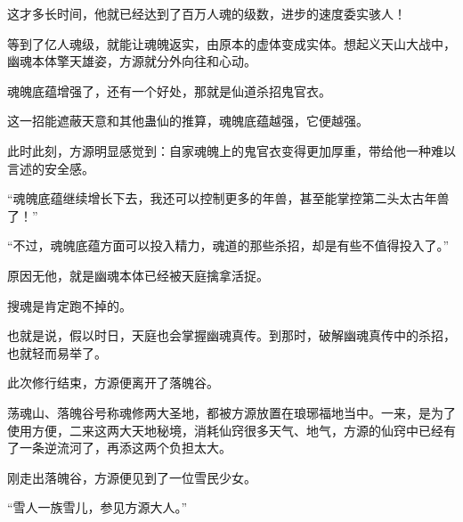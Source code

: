 \begin{this_body}
这才多长时间，他就已经达到了百万人魂的级数，进步的速度委实骇人！

等到了亿人魂级，就能让魂魄返实，由原本的虚体变成实体。想起义天山大战中，幽魂本体擎天雄姿，方源就分外向往和心动。

魂魄底蕴增强了，还有一个好处，那就是仙道杀招鬼官衣。

这一招能遮蔽天意和其他蛊仙的推算，魂魄底蕴越强，它便越强。

此时此刻，方源明显感觉到：自家魂魄上的鬼官衣变得更加厚重，带给他一种难以言述的安全感。

“魂魄底蕴继续增长下去，我还可以控制更多的年兽，甚至能掌控第二头太古年兽了！”

“不过，魂魄底蕴方面可以投入精力，魂道的那些杀招，却是有些不值得投入了。”

原因无他，就是幽魂本体已经被天庭擒拿活捉。

搜魂是肯定跑不掉的。

也就是说，假以时日，天庭也会掌握幽魂真传。到那时，破解幽魂真传中的杀招，也就轻而易举了。

此次修行结束，方源便离开了落魄谷。

荡魂山、落魄谷号称魂修两大圣地，都被方源放置在琅琊福地当中。一来，是为了使用方便，二来这两大天地秘境，消耗仙窍很多天气、地气，方源的仙窍中已经有了一条逆流河了，再添这两个负担太大。

刚走出落魄谷，方源便见到了一位雪民少女。

“雪人一族雪儿，参见方源大人。”

\end{this_body}

